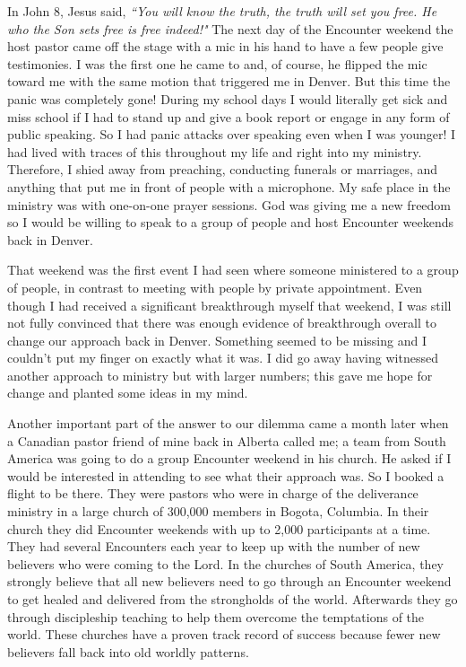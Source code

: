 \documentclass[oneside,12pt]{book}
\begin{document}
In John 8, Jesus said, \textit{``You will know the truth, the truth will set you free. He who the Son sets free is free indeed!"} The next day of the Encounter weekend the host pastor came off the stage with a mic in his hand to have a few people give testimonies. I was the first one he came to and, of course, he flipped the mic toward me with the same motion that triggered me in Denver. But this time the panic was completely gone! During my school days I would literally get sick and miss school if I had to stand up and give a book report or engage in any form of public speaking. So I had panic attacks over speaking even when I was younger! I had lived with traces of this throughout my life and right into my ministry. Therefore, I shied away from preaching, conducting funerals or marriages, and anything that put me in front of people with a microphone. My safe place in the ministry was with one-on-one prayer sessions. God was giving me a new freedom so I would be willing to speak to a group of people and host Encounter weekends back in Denver. 


That weekend was the first event I had seen where someone ministered to a group of people, in contrast to meeting with people by private appointment. Even though I had received a significant breakthrough myself that weekend, I was still not fully convinced that there was enough evidence of breakthrough overall to change our approach back in Denver. Something seemed to be missing and I couldn't put my finger on exactly what it was. I did go away having witnessed another approach to ministry but with larger numbers; this gave me hope for change and planted some ideas in my mind.

Another important part of the answer to our dilemma came a month later when a Canadian pastor friend of mine back in Alberta called me; a team from South America was going to do a group Encounter weekend in his church. He asked if I would be interested in attending to see what their approach was. So I booked a flight to be there. They were pastors who were in charge of the deliverance ministry in a large church of 300,000 members in Bogota, Columbia. In their church they did Encounter weekends with up to 2,000 participants at a time. They had several Encounters each year to keep up with the number of new believers who were coming to the Lord. In the churches of South America, they strongly believe that all new believers need to go through an Encounter weekend to get healed and delivered from the strongholds of the world. Afterwards they go through discipleship teaching to help them overcome the temptations of the world. These churches have a proven track record of success because fewer new believers fall back into old worldly patterns. 
\end{document}
